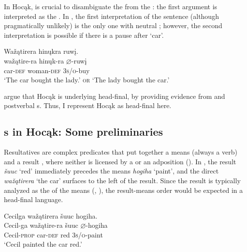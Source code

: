\documentclass[output=paper]{LSP/langsci}
\begin{document}
In Hocąk,  is crucial to disambiguate the  from the : the first argument is interpreted as the . In , the first interpretation of the sentence (although pragmatically unlikely) is the only one with neutral ; however, the second interpretation is  possible if there is a pause after `car'.

\begin{exe}
\ex\label{ex:rosen:6}
 \glll Wažątirera hinųkra ruwį.\\
wažątire-ra hinųk-ra {$\varnothing$}-ruwį\\
car-\textsc{def} woman-\textsc{def} \textsc{3s/o}-buy\\
\glt `The car bought the lady.' \textsc{or} `The lady bought the car.'

\end{exe}

\citet{JohnsonRosen2014} argue that Hocąk is underlying head-final, by providing evidence from  and postverbal s. Thus, I represent Hocąk as head-final here.

\subsection{s in Hocąk: Some preliminaries}

Resultatives are complex predicates that put together a means  (always a verb) and a result , where neither is licensed by a  or an adposition (\citealt{Williams2008}). In , the result \textit{šuuc} `red' immediately precedes the means \textit{hogiha} `paint', and the direct  \textit{wažątirera} `the car' surfaces to the left of the result. Since the result is typically analyzed as the  of the means (\citealt{Li1999}, \citealt{Williams2008}), the result-means order would be expected in a head-final language.

\begin{exe}

\ex \label{ex:rosen:7}\glll Cecilga wažątirera šuuc hogiha. \\
Cecil-ga  wažątire-ra šuuc {$\varnothing$}-hogiha \\
Cecil-\textsc{prop} car-\textsc{def} red \textsc{3s/o}-paint\\
\glt `Cecil painted the car red.'

\end{exe}
\end{document}
